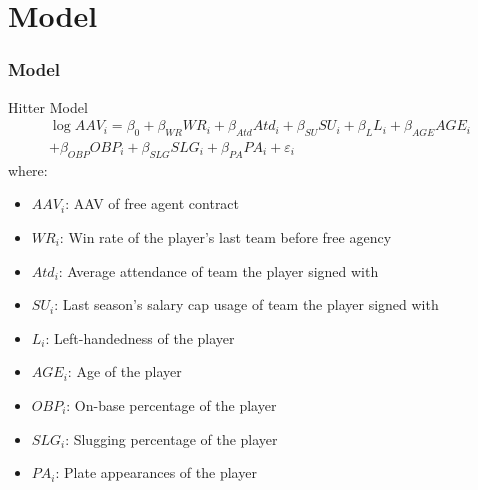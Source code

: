 \documentclass[9pt]{beamer}
\begin{document}
\section{Model}
\begin{frame}
    \frametitle{Model}
    \begin{block}{Hitter Model}
        \begin{multline}
            \log{AAV_{i}} = \beta_{0} 
                + \beta_{WR}WR_{i} 
                + \beta_{Atd}Atd_{i} 
                + \beta_{SU}SU_{i}
                + \beta_{L}L_{i} 
                + \beta_{AGE}AGE_{i} \\
                + \beta_{OBP}OBP_{i}
                + \beta_{SLG}SLG_{i}
                + \beta_{PA}PA_{i}
                + \varepsilon_{i}
        \end{multline}
        where:
        \begin{itemize}
            \item $AAV_{i}$: AAV of free agent contract
            \item $WR_{i}$: Win rate of the player's last team before free agency
            \item $Atd_{i}$: Average attendance of team the player signed with
            \item $SU_{i}$: Last season's salary cap usage of team the player signed with
            \item $L_{i}$: Left-handedness of the player
            \item $AGE_{i}$: Age of the player
            \item $OBP_{i}$: On-base percentage of the player
            \item $SLG_{i}$: Slugging percentage of the player
            \item $PA_{i}$: Plate appearances of the player
        \end{itemize}
    \end{block}
\end{frame}
\end{document}
